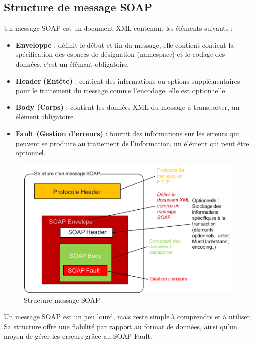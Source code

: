 \subsection{Structure de message SOAP}
Un message SOAP est un document XML contenant les éléments suivants : \cite{refTutorialPointsSOAP}
\begin{itemize}
	\item \textbf{Enveloppe} : définit le début et fin du message, elle contient contient la spécification des espaces de désignation (namespace) et le codage des données. c'est un élément obligatoire.
	\item \textbf{Header (Entête)} : contient des informations ou options supplémentaires pour le traitement du message comme l'encodage, elle est optionnelle.
	\item \textbf{Body (Corps)} : contient les données XML du message à transporter, un élément obligatoire.
	\item \textbf{Fault (Gestion d'erreurs)} : fournit des informations sur les erreurs qui peuvent se produire au traitement de l'information, un élément qui peut être optionnel.
\end{itemize}
\begin{figure}[h]
	\begin{center}
		\includegraphics[scale=1]{img/soapmessagebody.png}
	\end{center}	
	\label{Structure message SOAP}
	\caption{Structure message SOAP}		
	\centering
\end{figure}			
Un message SOAP est un peu lourd, mais reste simple à comprendre et à utiliser. Sa structure offre une fiabilité par rapport au format de données, ainsi qu'un moyen de gérer les erreurs grâce au SOAP Fault.

